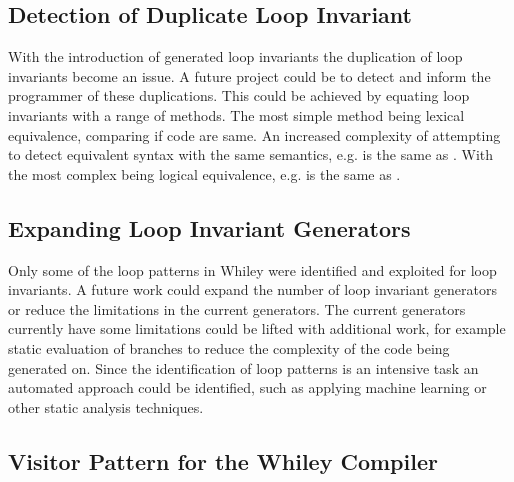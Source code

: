 \subsection{Detection of Duplicate Loop Invariant}

With the introduction of generated loop invariants the duplication of loop
invariants become an issue.
A future project could be to detect and inform the programmer of these
duplications.
This could be achieved by equating loop invariants with a range of methods.
The most simple method being lexical equivalence, comparing if code are same.
An increased complexity of attempting to detect equivalent syntax with the same
semantics, e.g.  is the same as .
With the most complex being logical equivalence, e.g.  is the same
as .


\subsection{Expanding Loop Invariant Generators}

Only some of the loop patterns in Whiley were identified and exploited for loop
invariants.
A future work could expand the number of loop invariant generators or reduce
the limitations in the current generators.
The current generators currently have some limitations could be lifted with
additional work, for example static evaluation of branches to reduce the
complexity of the code being generated on.
Since the identification of loop patterns is an intensive task an automated
approach could be identified, such as applying machine learning or other static
analysis techniques.

\subsection{Visitor Pattern for the Whiley Compiler}

